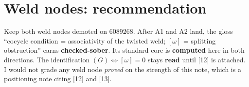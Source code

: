 \documentclass[11pt]{article}
\begin{document}
\section*{Weld nodes: recommendation}
Keep both weld nodes demoted on 6089268. After A1 and A2 land, the gloss
``cocycle condition = associativity of the twisted weld; $[\omega]$ = splitting obstruction'' earns
\textbf{checked-sober}. Its standard core is \textbf{computed} here in both directions. The
identification $(G)\iff[\omega]=0$ stays \textbf{read} until [12] is attached. I would not grade any
weld node \emph{proved} on the strength of this note, which is a positioning note citing [12] and
[13].
\end{document}
